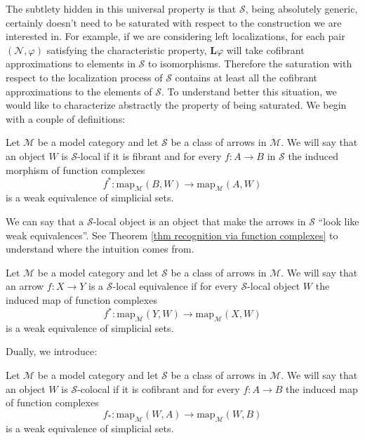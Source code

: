 \begin{refsection}
The subtlety hidden in this universal property is that $\mathcal S$, being absolutely generic, certainly doesn't need to be saturated with respect to the construction we are interested in. For example, if we are considering left localizations, for each pair $(\mathcal N,\varphi)$ satisfying the characteristic property, $\mathbf L\varphi$ will take cofibrant approximations to elements in $\mathcal S$ to isomorphisms. Therefore the saturation with respect to the localization process of $\mathcal S$ contains at least all the cofibrant approximations to the elements of $\mathcal S$. To understand better this situation, we would like to characterize abstractly the property of being saturated. We begin with a couple of definitions:

\begin{defin}
Let $\mathcal M$ be a model category and let $\mathcal S$ be a class of arrows in $\mathcal M$. We will say that an object $W$ is $\mathcal S$-local if it is fibrant and for every $f \colon A \to B$ in $\mathcal S$ the induced morphism of function complexes
\[
f^* \colon \mathrm{map}_{\mathcal M}(B,W) \to \mathrm{map}_{\mathcal M}(A,W)
\]
is a weak equivalence of simplicial sets.
\end{defin}

\begin{rmk}
We can say that a $\mathcal S$-local object is an object that make the arrows in $\mathcal S$ ``look like weak equivalences''. See Theorem \ref{thm recognition via function complexes} to understand where the intuition comes from.
\end{rmk}

\begin{defin}
Let $\mathcal M$ be a model category and let $\mathcal S$ be a class of arrows in $\mathcal M$. We will say that an arrow $f \colon X \to Y$ is a $\mathcal S$-local equivalence if for every $\mathcal S$-local object $W$ the induced map of function complexes
\[
f^* \colon \mathrm{map}_{\mathcal M}(Y,W) \to \mathrm{map}_{\mathcal M}(X,W)
\]
is a weak equivalence of simplicial sets.
\end{defin}

Dually, we introduce:

\begin{defin}
Let $\mathcal M$ be a model category and let $\mathcal S$ be a class of arrows in $\mathcal M$. We will say that an object $W$ is $\mathcal S$-colocal if it is cofibrant and for every $f \colon A \to B$ the induced map of function complexes
\[
f_* \colon \mathrm{map}_{\mathcal M}(W,A) \to \mathrm{map}_{\mathcal M}(W,B)
\]
is a weak equivalence of simplicial sets.
\end{defin}


\end{refsection}
